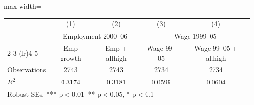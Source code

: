 \begin{adjustbox}{max width=\textwidth}
\begin{tabular}{lcccc}
\toprule
 & (1) & (2) & (3) & (4) \\
 & \multicolumn{2}{c}{Employment 2000--06} & \multicolumn{2}{c}{Wage 1999--05} \\
\cmidrule(lr){2-3} \cmidrule(lr){4-5}
 & Emp growth & Emp + allhigh & Wage 99--05 & Wage 99--05 + allhigh \\
\midrule
\midrule
Observations & 2743 & 2743 & 2734 & 2734 \\
$R^2$ & 0.3174 & 0.3181 & 0.0596 & 0.0604 \\
\bottomrule
\multicolumn{5}{l}{\footnotesize Robust SEs. *** p$<$0.01, ** p$<$0.05, * p$<$0.1} \\
\end{tabular}
\end{adjustbox}
